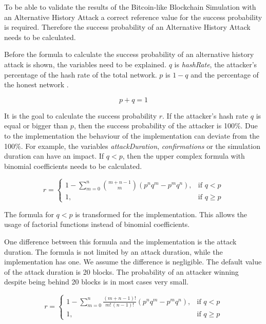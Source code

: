 To be able to validate the results of the Bitcoin-like Blockchain Simulation with an Alternative History Attack a correct reference value for the success probability is required. Therefore the success probability of an Alternative History Attack needs to be calculated.

Before the formula to calculate the success probability of an alternative history attack is shown, the variables need to be explained.
$q$ is \textit{hashRate}, the attacker's percentage of the hash rate of the total network. $p$ is $1-q$ and the percentage of the honest network \cite{doublespending}.

\begin{equation}
p + q = 1
\end{equation}

It is the goal to calculate the success probability $r$. If the attacker's hash rate $q$ is equal or bigger than $p$, then the success probability of the attacker is 100\%.
Due to the implementation the behaviour of the implementation can deviate from the 100\%. For example, the variables \textit{attackDuration}, \textit{confirmations} or the simulation duration can have an impact.
If $q < p$, then the upper complex formula with binomial coefficients needs to be calculated.

\begin{equation}
    r = 
\begin{cases}
    1-\sum\limits_{m=0}^n \binom{m+n-1}{m}(p^nq^m-p^mq^n),& \text{if } q < p\\
    1,              & \text{if } q \geq p
\end{cases}
\end{equation}

The formula for $q < p$ is transformed for the implementation. This allows the usage of factorial functions instead of binomial coefficients.

One difference between this formula and the implementation is the attack duration. The formula is not limited by an attack duration, while the implementation has one. We assume the difference is negligible. The default value of the attack duration is 20 blocks. The probability of an attacker winning despite being behind 20 blocks is in most cases very small.

\begin{equation}\label{eq:successProbability}
    r = 
\begin{cases}
    1-\sum\limits_{m=0}^n \frac{(m+n-1)!}{m!\,(n-1)!}(p^nq^m-p^mq^n),& \text{if } q < p\\
    1,              & \text{if } q \geq p
\end{cases}
\end{equation}

